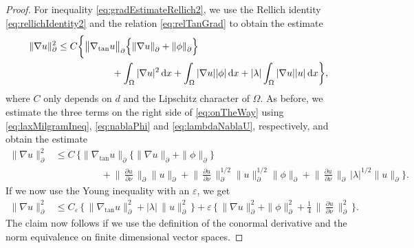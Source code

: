 \begin{proof}
  For inequality \eqref{eq:gradEstimateRellich2}, we use the Rellich identity \eqref{eq:rellichIdentity2} and the relation \eqref{eq:relTanGrad} to obtain the estimate
  \begin{align}
    \label{eq:onTheWay}
    \begin{alignedat}{1}
    \| \nabla u\|_\partial^2 
    &\leq C \bigg\{ \big\|\nabla_{\mathrm{tan}} u\big\|^{}_\partial 
    \Big\{ \|\nabla u\|^{}_\partial + \|\phi\|^{}_\partial \Big\}   \\
    &\hspace{2cm} + \int_\Omega |\nabla u|^2 \, {\operatorname{d}\!{x}} + \int_\Omega |\nabla u| |\phi| \, {\operatorname{d}\!{x}} + |\lambda| \int_\Omega |\nabla u| |u|\, {\operatorname{d}\!{x}} \bigg\},
  \end{alignedat}
  \end{align}
  where $C$ only depends on $d$ and the Lipschitz character of $\Omega$.
  As before, we estimate the three terms on the right side of \eqref{eq:onTheWay} using \eqref{eq:laxMilgramIneq}, \eqref{eq:nablaPhi} and \eqref{eq:lambdaNablaU}, respectively, and obtain the estimate
  \begin{align*}
    \| \nabla u\|_\partial^2 
    &\leq C\, \bigg\{ \big\|\nabla_{\mathrm{tan}} u\big\|^{}_\partial 
    \Big\{ \|\nabla u\|^{}_\partial + \|\phi\|^{}_\partial \Big\}   \\
    &\hspace{2cm} + \Big\|\, \frac{\partial u}{\partial \nu} \, \Big\|^{}_\partial \| u\|^{}_\partial
+ \Big\|\, \frac{\partial u}{\partial \nu} \, \Big\|_\partial^{1/2} \|u\|_\partial^{1/2} \|\phi\|^{}_\partial + \Big\|\, \frac{\partial u}{\partial \nu} \,\Big\|^{}_\partial \, |\lambda|^{1/2} \big\| u  \big\|^{}_\partial \bigg\}.
  \end{align*}
  If we now use the Young inequality with an $\varepsilon$, we get
  \begin{align*}
    \|\nabla u\|_\partial^2 
    &\leq C_\varepsilon\, \Big\{ \, \|\nabla_{\mathrm{tan}} u\|_\partial^2 + |\lambda|\, \| u\|_\partial^2 \, \Big\}  + \varepsilon\, \bigg\{ \, \|\nabla u\|_\partial^2 + \|\phi\|_\partial^2 + \frac{1}{4}\,\Big\|\,\frac{\partial u}{\partial \nu} \, \Big\|_\partial^2 \, \bigg\}.
  \end{align*}
  The claim now follows if we use the definition of the conormal derivative and the norm equivalence on finite dimensional vector spaces.
\end{proof}

